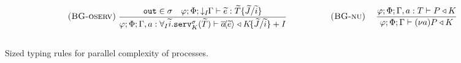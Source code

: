 \begin{table*}
\begin{framed}
\begin{align*}
        &\kern2em\runa{BG-oserv}\;\infrule{\texttt{out}\in\sigma\quad \varphi;\Phi;\susumesim{\Gamma}{I}\vdash \widetilde{e} : \widetilde{T}\substi{\widetilde{J}}{\widetilde{i}}}{\varphi;\Phi;\Gamma, a : \servt{I}{\widetilde{i}}{\sigma}{K}{\widetilde{T}}\vdash \asyncoutputch{a}{\widetilde{e}}{} \triangleleft K\!\substi{\widetilde{J}}{\widetilde{i}} + I}\kern12em \runa{BG-nu}\;\infrule{\varphi;\Phi;\Gamma,\withtype{a}{T} \vdash \withcomplex{P}{K}}{\varphi;\Phi;\Gamma \vdash \newvar{a}{\withcomplex{P}{K}}}
    \end{align*}\vspace{-1em}\end{framed}
    \smallskip
    \caption{Sized typing rules for parallel complexity of processes.}
    \label{tab:bgprocesstypingrules}
\end{table*}
